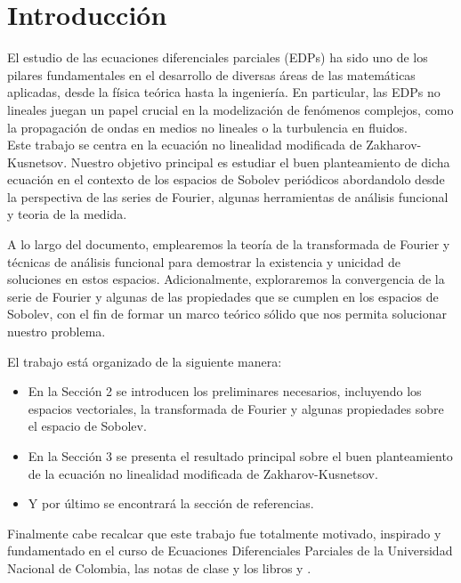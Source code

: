\section{Introducción}\label{sec:introduccion}
El estudio de las ecuaciones diferenciales parciales (EDPs) ha sido uno de los pilares fundamentales en el desarrollo de diversas áreas de las matemáticas aplicadas, desde la física teórica hasta la ingeniería. En particular, las EDPs no lineales juegan un papel crucial en la modelización de fenómenos complejos, como la propagación de ondas en medios no lineales o la turbulencia en fluidos.\\

Este trabajo se centra en la ecuación no linealidad modificada de Zakharov-Kusnetsov. Nuestro objetivo principal es estudiar el buen planteamiento de dicha ecuación en el contexto de los espacios de Sobolev periódicos abordandolo desde la perspectiva de las series de Fourier, algunas herramientas de análisis funcional y teoria de la medida.

A lo largo del documento, emplearemos la teoría de la transformada de Fourier y técnicas de análisis funcional para demostrar la existencia y unicidad de soluciones en estos espacios. Adicionalmente, exploraremos la convergencia de la serie de Fourier y algunas de las propiedades que se cumplen en los espacios de Sobolev, con el fin de formar un marco teórico sólido que nos permita solucionar nuestro problema.

El trabajo está organizado de la siguiente manera:
\begin{itemize}
    \item En la Sección 2 se introducen los preliminares necesarios, incluyendo los espacios vectoriales, la transformada de Fourier y algunas propiedades sobre el espacio de Sobolev.
    \item En la Sección 3 se presenta el resultado principal sobre el buen planteamiento de la ecuación no linealidad modificada de Zakharov-Kusnetsov.
    \item Y por último se encontrará la sección de referencias.
\end{itemize}
Finalmente cabe recalcar que este trabajo fue totalmente motivado, inspirado y fundamentado en el curso de Ecuaciones Diferenciales Parciales de la Universidad Nacional de Colombia, las notas de clase y los libros \cite{MR2597943} y \cite{MR3243734}.
